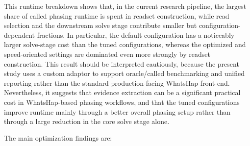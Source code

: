 \documentclass[
]{article}
\begin{document}
This runtime breakdown shows that, in the current research pipeline, the
largest share of called phasing runtime is spent in readset
construction, while read selection and the downstream solve stage
contribute smaller but configuration-dependent fractions. In particular,
the default configuration has a noticeably larger solve-stage cost than
the tuned configurations, whereas the optimized and speed-oriented
settings are dominated even more strongly by readset construction. This
result should be interpreted cautiously, because the present study uses
a custom adaptor to support oracle/called benchmarking and unified
reporting rather than the standard production-facing WhatsHap front-end.
Nevertheless, it suggests that evidence extraction can be a significant
practical cost in WhatsHap-based phasing workflows, and that the tuned
configurations improve runtime mainly through a better overall phasing
setup rather than through a large reduction in the core solve stage
alone.

The main optimization findings are:
\end{document}

